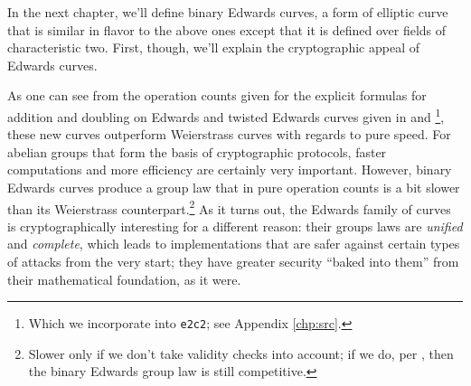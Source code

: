 In the next chapter, we'll define binary Edwards curves, a form of elliptic
    curve that is similar in flavor to the above ones except that it is
    defined over fields of characteristic two.
First, though, we'll explain the cryptographic appeal of Edwards curves.


As one can see from the operation counts given for the explicit formulas for
addition and doubling on Edwards and twisted Edwards curves given in
    \cite{bernstein2007faster} and \cite{bernstein2008twisted}\footnote{Which
    we incorporate into \texttt{e2c2}; see Appendix \ref{chp:src}.}, these new
    curves outperform Weierstrass curves with regards to pure speed.
For abelian groups that form the basis of cryptographic protocols, faster
    computations and more efficiency are certainly very important.
However, binary Edwards curves produce a group law that in pure operation
    counts is a bit slower than its Weierstrass counterpart.\footnote{Slower
    only if we don't take validity checks into account; if we do, per
    \cite{moloneyefficient}, then the binary Edwards group law is still
    competitive.}
As it turns out, the Edwards family of curves is cryptographically interesting
    for a different reason: their groups laws are \textit{unified} and
    \textit{complete}, which leads to implementations that are safer against
    certain types of attacks from the very start; they have greater security
    ``baked into them'' from their mathematical foundation, as it were.

